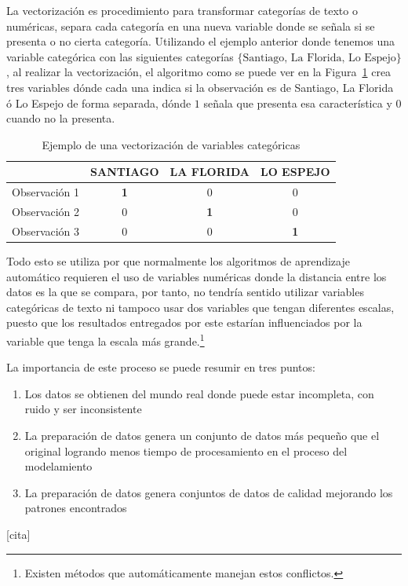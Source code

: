 \begin{description}
  La vectorización es procedimiento para transformar categorías de texto o numéricas, separa cada categoría en una nueva variable donde se señala si se presenta o no cierta categoría. Utilizando el ejemplo anterior donde tenemos una variable categórica con las siguientes categorías $\{\textrm{Santiago, La Florida, Lo Espejo}\}$, al realizar la vectorización, el algoritmo como se puede ver en la Figura~\ref{fig:vect} crea tres variables dónde cada una indica si la observación es de Santiago, La Florida ó Lo Espejo de forma separada, dónde $1$ señala que presenta esa característica y $0$ cuando no la presenta.
    \begin{table}[H]
    \centering
    \begin{tabular}{l|c|c|c|}
    \cline{2-4}
     & \multicolumn{1}{l|}{\textbf{SANTIAGO}} & \multicolumn{1}{l|}{\textbf{LA FLORIDA}} & \multicolumn{1}{l|}{\textbf{LO ESPEJO}} \\ \hline
    \multicolumn{1}{|l|}{Observación 1} & \textbf{1} & 0 & 0 \\ \hline
    \multicolumn{1}{|l|}{Observación 2} & 0 & \textbf{1} & 0 \\ \hline
    \multicolumn{1}{|l|}{Observación 3} & 0 & 0 & \textbf{1} \\ \hline
    \end{tabular}
    \caption{Ejemplo de una vectorización de variables categóricas}
    \label{fig:vect}
    \end{table}
      
  Todo esto se utiliza por que normalmente los algoritmos de aprendizaje automático requieren el uso de variables numéricas donde la distancia entre los datos es la que se compara, por tanto, no tendría sentido utilizar variables categóricas de texto ni tampoco usar dos variables que tengan diferentes escalas, puesto que los resultados entregados por este estarían influenciados por la variable que tenga la escala más grande.\footnote{Existen métodos que automáticamente manejan estos conflictos.}

\end{description}
La importancia de este proceso se puede resumir en tres puntos:
\begin{enumerate}
  \item Los datos se obtienen del mundo real donde puede estar incompleta, con ruido y ser inconsistente
  \item La preparación de datos genera un conjunto de datos más pequeño que el original logrando menos tiempo de procesamiento en el proceso del modelamiento
  \item La preparación de datos genera conjuntos de datos de calidad mejorando los patrones encontrados
\end{enumerate}
[cita]

